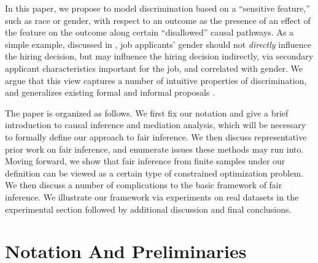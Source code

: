 \documentclass[letterpaper]{article} %
\newcommand{\citep}{\cite}
\begin{document}
In this paper, we propose to model discrimination based on a ``sensitive feature,'' such as race or gender, with respect to an outcome as the presence of an effect of the feature on the outcome along certain ``disallowed'' causal pathways.  As a simple example, discussed in \citep{pearl09causality}, job applicants' gender should not \emph{directly} influence the hiring decision, but may influence the hiring decision indirectly, via secondary applicant characteristics important for the job, and correlated with gender.  We argue that this view captures a number of intuitive properties of discrimination, and generalizes existing formal \citep{pearl09causality,Zhang17causal} and informal proposals \citep{Bertrand2004}.


The paper is organized as follows. We first fix our notation and give a brief introduction to causal inference and mediation analysis, which will be necessary to formally define our approach to fair inference. We then discuss representative prior work on fair inference, and enumerate issues these methods may run into. Moving forward, we show that fair inference from finite samples under our definition can be viewed as a certain type of constrained optimization problem. We then discuss a number of complications to the basic framework of fair inference. We illustrate our framework via experiments on real datasets in the experimental section followed by additional discussion and final conclusions. 

\section{Notation And Preliminaries} 
\label{sec:prelim}
\end{document}
